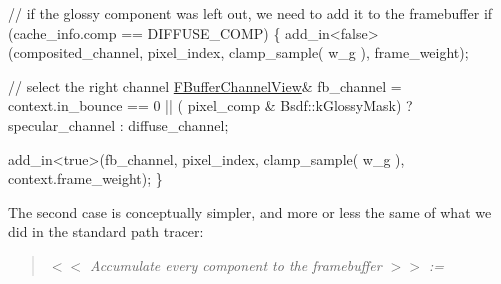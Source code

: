 \begin{DoxyCodeInclude}
                \textcolor{comment}{// if the glossy component was left out, we need to add it to the framebuffer}
                \textcolor{keywordflow}{if} (cache\_info.comp == DIFFUSE\_COMP)
                \{
                    add\_in<false>(composited\_channel, pixel\_index, clamp\_sample( w\_g ), frame\_weight);

                    \textcolor{comment}{// select the right channel}
                    \hyperlink{struct_f_buffer_channel_view}{FBufferChannelView}& fb\_channel = context.in\_bounce == 0 || (
      pixel\_comp & Bsdf::kGlossyMask) ?
                        specular\_channel :
                        diffuse\_channel;

                    add\_in<true>(fb\_channel, pixel\_index, clamp\_sample( w\_g ), context.frame\_weight);
                \}
\end{DoxyCodeInclude}
 \begin{DoxyParagraph}{}
The second case is conceptually simpler, and more or less the same of what we did in the standard path tracer\+:
\end{DoxyParagraph}
\label{_p_s_f_p_t_page_Accumulate_every_component_to_the_framebuffer_anchor}%
%
\begin{quote}
{\itshape  $<$$<$ Accumulate every component to the framebuffer $>$$>$ \+:= }

\end{quote}

